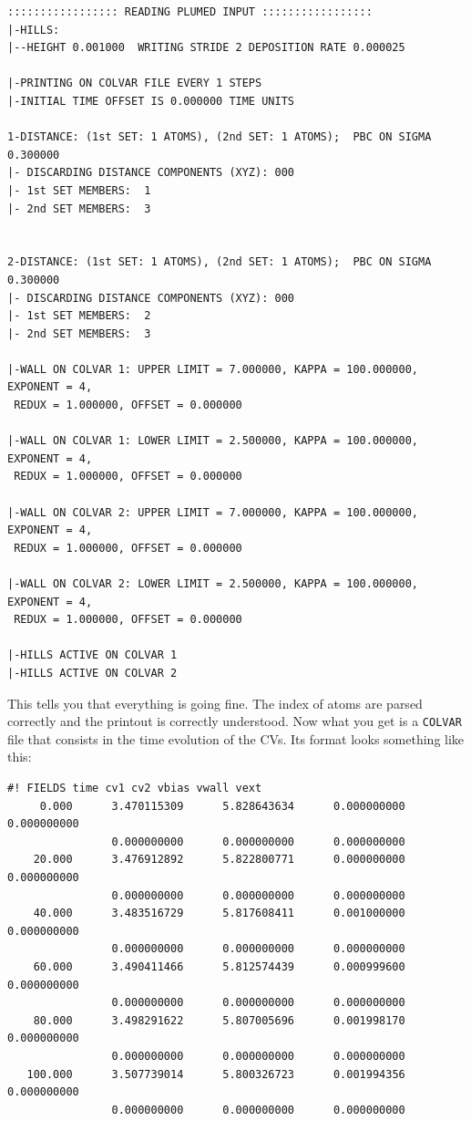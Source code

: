 \documentclass[12pt,a4paper]{article}
\begin{document}
\begin{verbatim}
::::::::::::::::: READING PLUMED INPUT :::::::::::::::::
|-HILLS:
|--HEIGHT 0.001000  WRITING STRIDE 2 DEPOSITION RATE 0.000025 

|-PRINTING ON COLVAR FILE EVERY 1 STEPS
|-INITIAL TIME OFFSET IS 0.000000 TIME UNITS

1-DISTANCE: (1st SET: 1 ATOMS), (2nd SET: 1 ATOMS);  PBC ON SIGMA 0.300000
|- DISCARDING DISTANCE COMPONENTS (XYZ): 000
|- 1st SET MEMBERS:  1 
|- 2nd SET MEMBERS:  3 


2-DISTANCE: (1st SET: 1 ATOMS), (2nd SET: 1 ATOMS);  PBC ON SIGMA 0.300000
|- DISCARDING DISTANCE COMPONENTS (XYZ): 000
|- 1st SET MEMBERS:  2 
|- 2nd SET MEMBERS:  3 

|-WALL ON COLVAR 1: UPPER LIMIT = 7.000000, KAPPA = 100.000000, EXPONENT = 4,
 REDUX = 1.000000, OFFSET = 0.000000 

|-WALL ON COLVAR 1: LOWER LIMIT = 2.500000, KAPPA = 100.000000, EXPONENT = 4,
 REDUX = 1.000000, OFFSET = 0.000000 

|-WALL ON COLVAR 2: UPPER LIMIT = 7.000000, KAPPA = 100.000000, EXPONENT = 4,
 REDUX = 1.000000, OFFSET = 0.000000 

|-WALL ON COLVAR 2: LOWER LIMIT = 2.500000, KAPPA = 100.000000, EXPONENT = 4,
 REDUX = 1.000000, OFFSET = 0.000000 

|-HILLS ACTIVE ON COLVAR 1
|-HILLS ACTIVE ON COLVAR 2
\end{verbatim}

This tells you that everything is going fine. The index of atoms are parsed correctly and the printout is correctly understood. Now what you get is a \texttt{COLVAR} file that consists in the time evolution of the CVs. Its format looks something like this:

\begin{verbatim}
#! FIELDS time cv1 cv2 vbias vwall vext
     0.000      3.470115309      5.828643634      0.000000000      0.000000000
                0.000000000      0.000000000      0.000000000
    20.000      3.476912892      5.822800771      0.000000000      0.000000000
                0.000000000      0.000000000      0.000000000
    40.000      3.483516729      5.817608411      0.001000000      0.000000000
                0.000000000      0.000000000      0.000000000
    60.000      3.490411466      5.812574439      0.000999600      0.000000000
                0.000000000      0.000000000      0.000000000
    80.000      3.498291622      5.807005696      0.001998170      0.000000000
                0.000000000      0.000000000      0.000000000
   100.000      3.507739014      5.800326723      0.001994356      0.000000000
                0.000000000      0.000000000      0.000000000
\end{verbatim}
\end{document}

